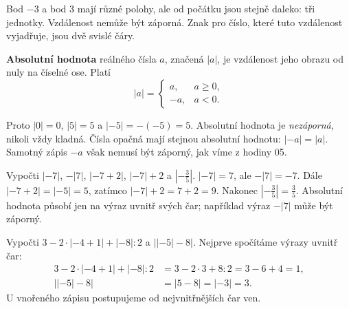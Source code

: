 \documentclass[11pt,a4paper]{article}
\begin{document}

Bod $-3$ a bod $3$ mají různé polohy, ale od počátku jsou stejně daleko:
tři jednotky. Vzdálenost nemůže být záporná. Znak pro číslo,
které tuto vzdálenost vyjadřuje, jsou dvě svislé čáry.

\begin{definiceBox}[title={Definice - Absolutní hodnota}]
\textbf{Absolutní hodnota} reálného čísla $a$, značená $|a|$,
je vzdálenost jeho obrazu od nuly na číselné ose. Platí
\[
|a|=\begin{cases}a,&a\ge0,\\-a,&a<0.\end{cases}
\]
\end{definiceBox}

Proto $|0|=0$, $|5|=5$ a $|-5|=-(-5)=5$.
Absolutní hodnota je \emph{nezáporná}, nikoli vždy kladná.
Čísla opačná mají stejnou absolutní hodnotu: $|-a|=|a|$.
Samotný zápis $-a$ však nemusí být záporný, jak víme z hodiny 05.

\begin{prikladReseniBox}[title={Příklad 1},breakable=false]
Vypočti $|-7|$, $-|7|$, $|-7+2|$, $|-7|+2$ a $|-\frac35|$.
\tcblower
$|-7|=7$, ale $-|7|=-7$.
Dále $|-7+2|=|-5|=5$, zatímco $|-7|+2=7+2=9$.
Nakonec $|-\frac35|=\frac35$.
Absolutní hodnota působí jen na výraz uvnitř svých čar;
například výraz $-|7|$ může být záporný.
\end{prikladReseniBox}

\begin{prikladReseniBox}[title={Příklad 2},breakable=false]
Vypočti $3-2\cdot|-4+1|+|-8|:2$ a $\bigl||-5|-8\bigr|$.
\tcblower
Nejprve spočítáme výrazy uvnitř čar:
\begin{align*}
3-2\cdot|-4+1|+|-8|:2&=3-2\cdot3+8:2=3-6+4=1,\\
\bigl||-5|-8\bigr|&=|5-8|=|-3|=3.
\end{align*}
U vnořeného zápisu postupujeme od nejvnitřnějších čar ven.
\end{prikladReseniBox}

\end{document}
